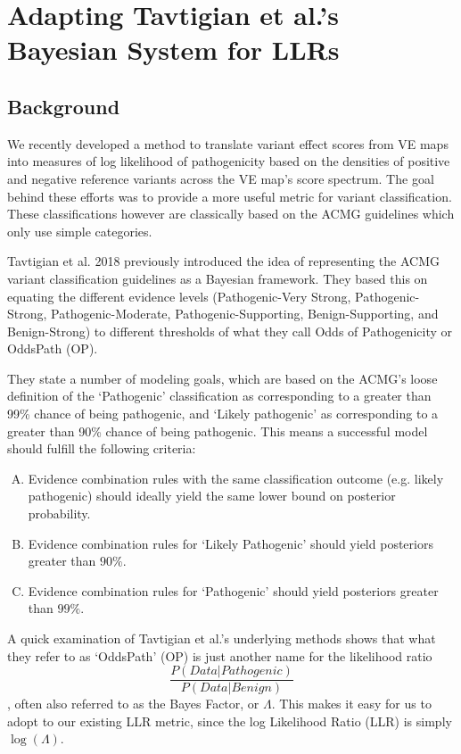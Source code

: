 \documentclass[12pt]{article}
\begin{document}


\section*{Adapting Tavtigian et al.'s Bayesian System for LLRs}

\subsection*{Background}

We recently developed a method to translate variant effect scores from VE maps
into measures of log likelihood of pathogenicity based on the densities of
positive and negative reference variants across the VE map's score spectrum.
The goal behind these efforts was to provide a more useful metric for variant
classification. These classifications however are classically based on the ACMG
guidelines which only use simple categories.

Tavtigian et al. 2018 previously introduced the idea of representing the ACMG
variant classification guidelines as a Bayesian framework. They based this on
equating the different evidence levels (Pathogenic-Very Strong, Pathogenic-Strong,
Pathogenic-Moderate, Pathogenic-Supporting, Benign-Supporting, and Benign-Strong)
to different thresholds of what they call Odds of Pathogenicity or OddsPath (OP).

They state a number of modeling goals, which are based on the ACMG's loose
definition of the `Pathogenic' classification as corresponding to a greater than
99\% chance of being pathogenic, and `Likely pathogenic' as corresponding to a
greater than 90\% chance of being pathogenic. This means a successful model
should fulfill the following criteria:
\begin{enumerate}[(A)]
  \item Evidence combination rules with the same classification outcome
  (e.g. likely pathogenic) should ideally yield the same lower bound on
  posterior probability.
  \item Evidence combination rules for `Likely Pathogenic' should yield
  posteriors greater than $90\%$.
  \item Evidence combination rules for `Pathogenic' should yield posteriors
  greater than $99\%$.
\end{enumerate}

A quick examination of Tavtigian et al.'s underlying methods shows that what
they refer to as `OddsPath' (OP) is just another name for the likelihood ratio
$$\frac{P(Data|Pathogenic)}{P(Data|Benign)}$$, often also referred to as the
Bayes Factor, or $\Lambda$. This makes it easy for us to adopt to our existing
LLR metric, since the log Likelihood Ratio (LLR) is simply $\log(\Lambda)$.
\end{document}
